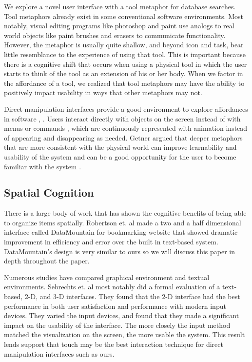\documentclass{article}
\begin{document}
We explore a novel user interface with a tool metaphor for database searches.  Tool metaphors already exist in some conventional software environments.  Most notably, visual editing programs like photoshop and paint use analogs to real world objects like paint brushes and erasers to communicate functionality.  However, the metaphor is usually quite shallow, and beyond icon and task, bear little resemblance to the experience of using that tool.  This is important because there is a cognitive shift that occurs when using a physical tool in which the user starts to think of the tool as an extension of his or her body.  \cite{Maravita2004}  When we factor in the affordance of a tool, we realized that tool metaphors may have the ability to positively impact usability in ways that other metaphors may not.  

Direct manipulation interfaces provide a good environment to explore affordances in software \cite{Gaver1991}, \cite{Norman1991}.  Users interact directly with objects on the screen instead of with menus or commands \cite{Hutchins1989} \cite{Shneiderman1992}, which are continuously represented with animation instead of appearing and disappearing as needed.\cite{Shneiderman1992}  Getner argued that deeper metaphors that are more consistent with the physical world can improve learnability and usability of the system \cite{Gentner1996} and can be a good opportunity for the user to become familiar with the system \cite{Fischer1994}.  


\subsection{Spatial Cognition}
There is a large body of work that has shown the cognitive benefits of being able to organize items spatially. \cite{Agarawala2006} \cite{Robertson1998} Robertson et. al made a two and a half dimensional interface called DataMountain for bookmarking website that showed dramatic improvement in efficiency and error over the built in text-based system.  DataMountain's design is very similar to ours so we will discuss this paper in depth throughout the paper.    
	
	Numerous studies have compared graphical environment and textual environments.  Sebrechts et. al most notably did a formal evaluation of a text-based, 2-D, and 3-D interfaces.\cite{Sebrechts1999}  They found that the 2-D interface had the best performance in both user satisfaction and performance with modern input devices.  They varied the input devices, and found that they made a significant impact on the usability of the interface. The more closely the input method matched the visualization on the screen, the more usable the system.  This result lends support that touch may be the best interaction technique for direct manipulation interfaces such as ours.  
\end{document}
